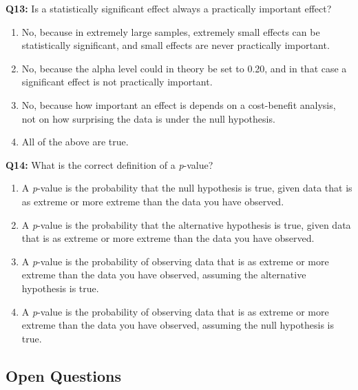 \documentclass[
  oneside]{book}
\providecommand{\tightlist}{%
  \setlength{\itemsep}{0pt}\setlength{\parskip}{0pt}}
\begin{document}
\textbf{Q13:} Is a statistically significant effect always a practically important effect?

\begin{enumerate}
\def\labelenumi{\Alph{enumi})}
\tightlist
\item
  No, because in extremely large samples, extremely small effects can be statistically significant, and small effects are never practically important.
\item
  No, because the alpha level could in theory be set to 0.20, and in that case a significant effect is not practically important.
\item
  No, because how important an effect is depends on a cost-benefit analysis, not on how surprising the data is under the null hypothesis.
\item
  All of the above are true.
\end{enumerate}

\textbf{Q14:} What is the correct definition of a \emph{p}-value?

\begin{enumerate}
\def\labelenumi{\Alph{enumi})}
\tightlist
\item
  A \emph{p}-value is the probability that the null hypothesis is true, given data that is as extreme or more extreme than the data you have observed.
\item
  A \emph{p}-value is the probability that the alternative hypothesis is true, given data that is as extreme or more extreme than the data you have observed.
\item
  A \emph{p}-value is the probability of observing data that is as extreme or more extreme than the data you have observed, assuming the alternative hypothesis is true.
\item
  A \emph{p}-value is the probability of observing data that is as extreme or more extreme than the data you have observed, assuming the null hypothesis is true.
\end{enumerate}

\hypertarget{open-questions}{%
\subsection{Open Questions}\label{open-questions}}
\end{document}
